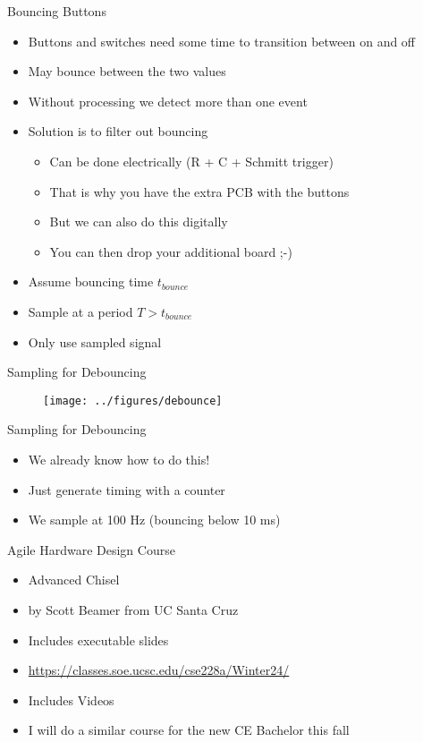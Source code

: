 \begin{frame}[fragile]{Bouncing Buttons}
\begin{itemize}
\item Buttons and switches need some time to transition between on and off
\item May bounce between the two values
\item Without processing we detect more than one event
\item Solution is to filter out bouncing
\begin{itemize}
\item Can be done electrically (R + C + Schmitt trigger)
\item That is why you have the extra PCB with the buttons
\item But we can also do this digitally
\item You can then drop your additional board ;-)
\end{itemize}
\item Assume  bouncing time $t_{bounce}$
\item Sample at a period $T > t_{bounce}$
\item Only use sampled signal
\end{itemize}
\end{frame}


\begin{frame}[fragile]{Sampling for Debouncing}
\begin{figure}
  \texttt{[image: ../figures/debounce]}
\end{figure}
\end{frame}


\begin{frame}[fragile]{Sampling for Debouncing}
\begin{itemize}
\item We already know how to do this!
\item Just generate timing with a counter
\item We sample at 100 Hz (bouncing below 10 ms)
\end{itemize}
\end{frame}



\begin{frame}[fragile]{Agile Hardware Design Course}
\begin{itemize}
\item Advanced Chisel
\item by Scott Beamer from UC Santa Cruz
\item Includes executable slides
\item \url{https://classes.soe.ucsc.edu/cse228a/Winter24/}
\item Includes Videos
\item I will do a similar course for the new CE Bachelor this fall
\end{itemize}
\end{frame}

